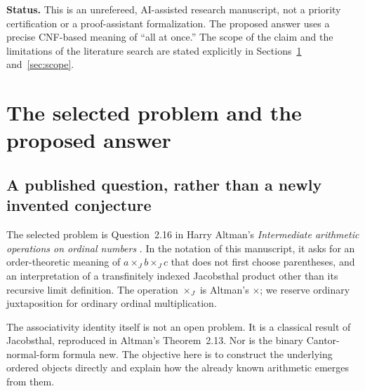 \documentclass[11pt,letterpaper]{article}
\theoremstyle{definition}
\theoremstyle{remark}
\newcommand{\J}{\mathbin{\times_{\!J}}}
\begin{document}
\begin{titlepage}
\begin{minipage}{0.92\textwidth}
\begin{abstract}
For arbitrary nonzero factors, ordinary and Jacobsthal partial products have
the same Cantor exponents and the same leading monomial. A uniform bound
$O_\xi\leq J_\xi<O_\xi\cdot2$ implies equality at every limit with cofinally
many nonunit factors. Removing units leaves an active index of the form
$\lambda+n$, where $\lambda$ is zero or a limit and $n$ is finite. The entire
product is an ordinary finite-support prefix followed by a single finite
pivot product. We also obtain an exact three-state test for equality with the
ordinary product and an order-theoretic proof of the binary natural-product
upper bound. Exact computational checks accompany, but do not replace, the
proofs.
\end{abstract}
\vspace{0.12in}
\noindent\textbf{Status.} This is an unrefereed, AI-assisted research
manuscript, not a priority certification or a proof-assistant formalization.
The proposed answer uses a precise CNF-based meaning of ``all at once.''
The scope of the claim and the limitations of the literature search are
stated explicitly in Sections~\ref{sec:problem} and~\ref{sec:scope}.
\end{minipage}
\end{titlepage}

\tableofcontents
\newpage

\section{The selected problem and the proposed answer}\label{sec:problem}

\subsection{A published question, rather than a newly invented conjecture}

The selected problem is Question~2.16 in Harry Altman's
\emph{Intermediate arithmetic operations on ordinal numbers}
\cite{altman}. In the notation of this manuscript, it asks for an
order-theoretic meaning of $a\J b\J c$ that does not first choose parentheses,
and an interpretation of a transfinitely indexed Jacobsthal product other
than its recursive limit definition. The operation $\J$ is Altman's
$\times$; we reserve ordinary juxtaposition for ordinary ordinal
multiplication.

The associativity identity itself is not an open problem. It is a classical
result of Jacobsthal, reproduced in Altman's Theorem~2.13. Nor is the binary
Cantor-normal-form formula new. The objective here is to construct the
underlying ordered objects directly and explain how the already known
arithmetic emerges from them.
\end{document}
